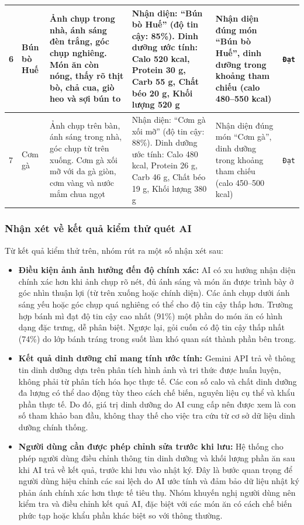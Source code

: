 \begin{longtable}{|p{0.6cm}|p{2.4cm}|p{2.8cm}|p{4cm}|p{3.8cm}|p{1.8cm}|}
    \hline
    6 & Bún bò Huế & Ảnh chụp trong nhà, ánh sáng đèn trắng, góc chụp nghiêng. Món ăn còn nóng, thấy rõ thịt bò, chả cua, giò heo và sợi bún to & Nhận diện: ``Bún bò Huế'' (độ tin cậy: 85\%). Dinh dưỡng ước tính: Calo 520 kcal, Protein 30 g, Carb 55 g, Chất béo 20 g, Khối lượng 520 g & Nhận diện đúng món ``Bún bò Huế'', dinh dưỡng trong khoảng tham chiếu (calo 480--550 kcal) & \texttt{Đạt} \\
    \hline
    7 & Cơm gà & Ảnh chụp trên bàn, ánh sáng trong nhà, góc chụp từ trên xuống. Cơm gà xối mỡ với da gà giòn, cơm vàng và nước mắm chua ngọt & Nhận diện: ``Cơm gà xối mỡ'' (độ tin cậy: 88\%). Dinh dưỡng ước tính: Calo 480 kcal, Protein 26 g, Carb 46 g, Chất béo 19 g, Khối lượng 380 g & Nhận diện đúng món ``Cơm gà'', dinh dưỡng trong khoảng tham chiếu (calo 450--500 kcal) & \texttt{Đạt} \\
    \hline
\end{longtable}
\endgroup

\subsubsection{Nhận xét về kết quả kiểm thử quét AI}

Từ kết quả kiểm thử trên, nhóm rút ra một số nhận xét sau:

\begin{itemize}
    \item \textbf{Điều kiện ảnh ảnh hưởng đến độ chính xác:} AI có xu hướng nhận diện chính xác hơn khi ảnh chụp rõ nét, đủ ánh sáng và món ăn được trình bày ở góc nhìn thuận lợi (từ trên xuống hoặc chính diện). Các ảnh chụp dưới ánh sáng yếu hoặc góc chụp quá nghiêng có thể cho độ tin cậy thấp hơn. Trường hợp bánh mì đạt độ tin cậy cao nhất (91\%) một phần do món ăn có hình dạng đặc trưng, dễ phân biệt. Ngược lại, gỏi cuốn có độ tin cậy thấp nhất (74\%) do lớp bánh tráng trong suốt làm khó quan sát thành phần bên trong.

    \item \textbf{Kết quả dinh dưỡng chỉ mang tính ước tính:} Gemini API trả về thông tin dinh dưỡng dựa trên phân tích hình ảnh và tri thức được huấn luyện, không phải từ phân tích hóa học thực tế. Các con số calo và chất dinh dưỡng đa lượng có thể dao động tùy theo cách chế biến, nguyên liệu cụ thể và khẩu phần thực tế. Do đó, giá trị dinh dưỡng do AI cung cấp nên được xem là con số tham khảo ban đầu, không thay thế cho việc tra cứu từ cơ sở dữ liệu dinh dưỡng chính thống.

    \item \textbf{Người dùng cần được phép chỉnh sửa trước khi lưu:} Hệ thống cho phép người dùng điều chỉnh thông tin dinh dưỡng và khối lượng phần ăn sau khi AI trả về kết quả, trước khi lưu vào nhật ký. Đây là bước quan trọng để người dùng hiệu chỉnh các sai lệch do AI ước tính và đảm bảo dữ liệu nhật ký phản ánh chính xác hơn thực tế tiêu thụ. Nhóm khuyến nghị người dùng nên kiểm tra và điều chỉnh kết quả AI, đặc biệt với các món ăn có cách chế biến phức tạp hoặc khẩu phần khác biệt so với thông thường.
\end{itemize}

